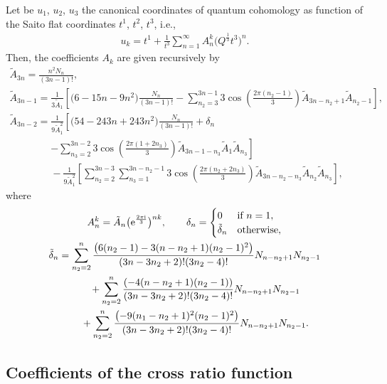 \begin{Corollary}
Let be $u_1$, $u_2$, $u_3$ the canonical coordinates of quantum cohomology as function of the Saito flat coordinates $t^1$, $t^2$, $t^3$, i.e.,
\begin{gather*}%
u_k=t^1+\frac{1}{t^3}\sum_{n=1}^{\infty} A_n^k \bigl( Q^{\frac{1}{3}}t^3 \bigr)^n.
\end{gather*}
Then, the coefficients $A_{k}$ are given recursively by
\begin{gather*}
\tilde A_{3n}=\frac{n^2N_n}{(3n-1)! },\\
 \tilde A_{3n-1}=\frac{1}{3 \tilde A_{1}}\left[\bigl(6-15n-9n^2 \bigr)\frac{N_n}{(3n-1)!}-\sum_{n_2=3}^{3n-1}3\cos\left( \frac{2\pi (n_2-1)}{3}\right) \tilde A_{3n-n_2+1} \tilde A_{n_2-1}\right],\\
 \tilde A_{3n-2}=\frac{1}{9\tilde A_1^2}\left[\bigl(54-243n +243n^2\bigr)\frac{N_n}{(3n-1)!}+\delta_{n} \right.\\
 \phantom{ \tilde A_{3n-2}=}{}\left.-\sum_{n_3=2}^{3n-2}3\cos\left( \frac{2\pi (1+2n_3 )}{3} \right) \tilde A_{3n-1-n_3} \tilde A_{1} \tilde A_{n_3}\right]\\
\phantom{ \tilde A_{3n-2}=}{}-\frac{1}{9\tilde A_1^2}\left[\sum_{n_2=2}^{3n-3}\sum_{n_3=1}^{3n-n_2-1}3\cos\left( \frac{2\pi (n_2+2n_3 )}{3} \right) \tilde A_{3n-n_2-n_3} \tilde A_{n_2} \tilde A_{n_3}\right],
\end{gather*}
where
\begin{gather*}
A_n^k=\tilde A_n \bigl( {\rm e}^{\frac{2\pi {\rm i}}{3}}\bigr)^{nk}
,\qquad
\delta_n=
\begin{cases}
0& \text{if } n=1,\\
 \tilde\delta_n & \text{otherwise},
\end{cases}
\\
\tilde\delta_n=\sum_{n_2=2}^{n}\frac{\bigl(6(n_2-1)-3(n-n_2+1)(n_2-1)^2 \bigr)}{(3n-3n_2+2)!(3n_2-4)!} N_{n-n_2+1}N_{n_2-1}\\
\phantom{\tilde\delta_n=}{}+\sum_{n_2=2}^{n}\frac{(-4(n-n_2+1)(n_2-1) )}{(3n-3n_2+2)!(3n_2-4)!} N_{n-n_2+1}N_{n_2-1}\\
\phantom{\tilde\delta_n=}{}+\sum_{n_2=2}^{n}\frac{\bigl(-9(n_1-n_2+1)^2(n_2-1)^2 \bigr)}{(3n-3n_2+2)!(3n_2-4)!} N_{n-n_2+1}N_{n_2-1}.
\end{gather*}
\end{Corollary}

\subsection{Coefficients of the cross ratio function}\label{Coefficients of the cross ratio function}

